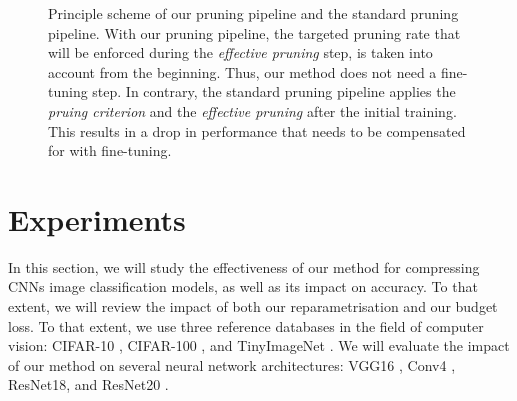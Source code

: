 \begin{figure}
  \centering
  \caption{ Principle scheme of our pruning pipeline and the standard
    pruning pipeline. With our pruning pipeline, the targeted pruning rate that will
    be enforced during the \emph{effective pruning} step, is taken into account
    from the beginning. Thus, our method does not need a fine-tuning step. In
    contrary, the standard pruning pipeline applies the \emph{pruing criterion}
    and the \emph{effective pruning} after the initial training. This results in a
    drop in performance that needs to be compensated for with fine-tuning.}
  \label{fig:chap1:pruning_pipeline_comparison}
\end{figure}


\section{Experiments}
\label{sec:chap1:experiments}
In this section, we will study the effectiveness of our method for compressing
\aclp{CNN} image classification models, as well as its impact on accuracy. To
that extent, we will review the impact of both our reparametrisation and our
budget loss. To that extent, we use three reference databases in the field of
computer vision: CIFAR-10 \cite{CIFARdataset}, CIFAR-100 \cite{CIFARdataset}, and
TinyImageNet \cite{TinyImageNet}. We will evaluate the impact of our method on
several neural network architectures: VGG16
\cite{DBLP:journals/corr/SimonyanZ14a}, Conv4 \cite{DBLP:conf/iclr/FrankleC19},
ResNet18, and ResNet20 \cite{DBLP:conf/cvpr/HeZRS16}. \\

